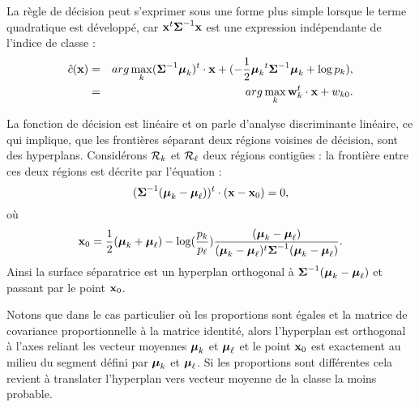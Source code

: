 La r\`egle de d\'ecision peut s'exprimer sous une forme plus simple lorsque le terme
quadratique est d\'evelopp\'e, car $\mbox{\bf x}^t \mbox{\boldmath $\Sigma$}^{-1} \mbox{\bf x}$ est une expression ind\'ependante
de l'indice de classe : 
\begin{eqnarray*}
\hat{c}(\mbox{\bf x}) & = & arg \max_k (\mbox{\boldmath $\Sigma$}^{-1} \mbox{\boldmath $\mu$}_k)^t \cdot \mbox{\bf x} + (-\frac{1}{2}{\mbox{\boldmath $\mu$}_k}^t\mbox{\boldmath $\Sigma$}^{-1} \mbox{\boldmath $\mu$}_k + \log p_k),\\
            & = & arg \max_k \mbox{\bf w}_k^t \cdot \mbox{\bf x} + w_{k0}.
\end{eqnarray*}

La fonction de d\'ecision est lin\'eaire et on parle d'analyse discriminante lin\'eaire, ce qui
implique, que les fronti\`eres s\'eparant deux  r\'egions voisines de d\'ecision, sont des hyperplans.
Consid\'erons  ${\cal R}_k$ et ${\cal R}_\ell$ deux r\'egions contig\"ues :  la fronti\`ere entre ces
deux r\'egions est d\'ecrite par l'\'equation : 
$$
(\mbox{\boldmath $\Sigma$}^{-1} (\mbox{\boldmath $\mu$}_k-\mbox{\boldmath $\mu$}_\ell))^t \cdot (\mbox{\bf x} - \mbox{\bf x}_0)=0,
$$ 
o\`u 
$$
\mbox{\bf x}_0=\frac{1}{2}(\mbox{\boldmath $\mu$}_k + \mbox{\boldmath $\mu$}_\ell) - \log (\frac{p_k}{p_\ell}) \frac{(\mbox{\boldmath $\mu$}_k-\mbox{\boldmath $\mu$}_\ell)}{(\mbox{\boldmath $\mu$}_k-\mbox{\boldmath $\mu$}_\ell)^t\mbox{\boldmath $\Sigma$}^{-1} (\mbox{\boldmath $\mu$}_k-\mbox{\boldmath $\mu$}_\ell) }.
$$
Ainsi la surface s\'eparatrice est un hyperplan orthogonal \`a $\mbox{\boldmath $\Sigma$}^{-1} (\mbox{\boldmath $\mu$}_k-\mbox{\boldmath $\mu$}_\ell)$ et
passant par le point $\mbox{\bf x}_0$.

Notons que dans le cas particulier o\`u les proportions 
sont \'egales et la matrice de covariance proportionnelle \`a la matrice identit\'e, alors
l'hyperplan est orthogonal \`a l'axes reliant les vecteur moyennes $\mbox{\boldmath $\mu$}_k$ et $\mbox{\boldmath $\mu$}_\ell$
et le point $\mbox{\bf x}_0$ est exactement au milieu du segment d\'efini par $\mbox{\boldmath $\mu$}_k$ et $\mbox{\boldmath $\mu$}_\ell$.
Si les proportions sont diff\'erentes cela revient \`a translater l'hyperplan vers vecteur
moyenne de la classe la moins probable.

